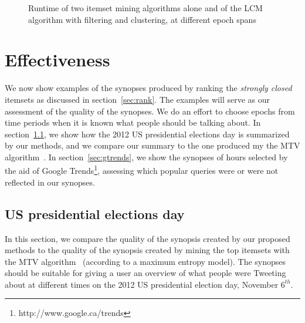 \documentclass[letterpaper,12pt,titlepage,oneside,final]{book}
\begin{document}
\begin{figure}[h]
\centering
{}
\caption{Runtime of two itemset mining algorithms alone and of the LCM algorithm with filtering and clustering, at different epoch spans}
\label{fig:lcmvsfpzhu}
\end{figure}

\section{Effectiveness}
\label{sec:effectiveness}
We now show examples of the synopses produced by ranking
the \emph{strongly closed} itemsets as discussed in section~\ref{sec:rank}.
The examples will serve as our assessment of the quality of 
the synopses. 
We do an effort to choose epochs from time periods when 
it is known what people should be talking about. 
In section~\ref{sec:electionsday}, 
we show how the 2012 US presidential elections day is summarized by our methods, %
and we compare our summary to the one produced my the MTV algorithm~\cite{mampaey2011tell}.
In section~\ref{sec:gtrends},
we show the synopses of hours selected by the aid of Google Trends\footnote{http://www.google.ca/trends},
assessing which popular queries were or were not reflected in our synopses.

\subsection{US presidential elections day}
\label{sec:electionsday}
In this section, we compare the quality of the synopsis created by
our proposed methods to the quality of the synopsis created by
mining the top itemsets with the MTV algorithm~\cite{mampaey2011tell} 
(according to a maximum entropy model).
The synopses should be suitable for giving 
a user an overview of what people were Tweeting about at%
different times on the 2012 US presidential election day, November $6^{th}$.
\end{document}
